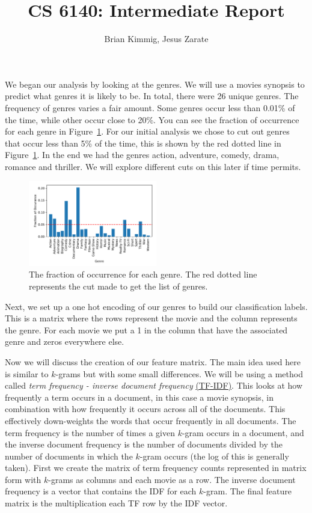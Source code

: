\documentclass[11pt]{article}
\title{CS 6140: Intermediate Report}
\author{Brian Kimmig, Jesus Zarate}
\date{}
\begin{document}
\maketitle

We began our analysis by looking at the genres. We will use a movies synopsis to predict what genres it is likely to be. In total, there were 26 unique genres. The frequency of genres varies a fair amount. Some genres occur less than 0.01\% of the time, while other occur close to 20\%. You can see the fraction of occurrence for each genre in Figure~\ref{fig:genre_fractions}. For our initial analysis we chose to cut out genres that occur less than 5\% of the time, this is shown by the red dotted line in Figure~\ref{fig:genre_fractions}. In the end we had the genres action, adventure, comedy, drama, romance and thriller. We will explore different cuts on this later if time permits.

\begin{figure}[h]
	\centering
		\includegraphics[width=0.5\textwidth]{genre_fractions_v2p0.pdf}
	\caption{The fraction of occurrence for each genre. The red dotted line represents the cut made to get the list of genres.}
	\label{fig:genre_fractions}
\end{figure}

Next, we set up a one hot encoding of our genres to build our classification labels. This is a matrix where the rows represent the movie and the column represents the genre. For each movie we put a 1 in the column that have the associated genre and zeros everywhere else.

Now we will discuss the creation of our feature matrix. The main idea used here is similar to $k$-grams but with some small differences. We will be using a method called {\it term frequency - inverse document frequency} \href{https://en.wikipedia.org/wiki/Tf%E2%80%93idf}{(TF-IDF)}. This looks at how frequently a term occurs in a document, in this case a movie synopsis, in combination with how frequently it occurs across all of the documents. This effectively down-weights the words that occur frequently in all documents. The term frequency is the number of times a given $k$-gram occurs in a document, and the inverse document frequency is the number of documents divided by the number of documents in which the $k$-gram occurs (the log of this is generally taken). First we create the matrix of term frequency counts represented in matrix form with $k$-grams as columns and each movie as a row. The inverse document frequency is a vector that contains the IDF for each $k$-gram. The final feature matrix is the multiplication each TF row by the IDF vector.
\end{document}
